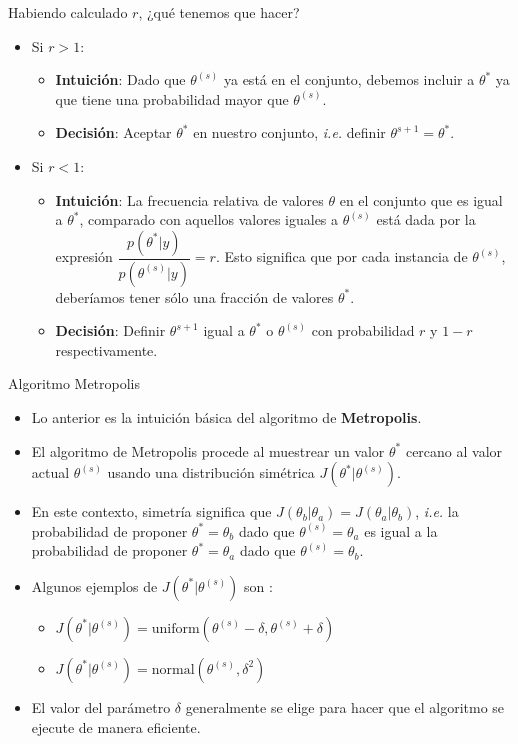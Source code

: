 \documentclass[11pt]{beamer}
\begin{document}
\begin{frame}
Habiendo calculado $r$, ¿qué tenemos que hacer?

	\begin{itemize}
		\item Si $r >1$:
			\begin{itemize}
				\item \textbf{Intuición}: Dado que $\theta^{(s)}$ ya está en el conjunto, debemos incluir a $\theta^{*}$ ya que tiene una probabilidad mayor que $\theta^{(s)}$.
				\item \textbf{Decisión}: Aceptar $\theta^{*}$ en nuestro conjunto, \textit{i.e.} definir $\theta^{s+1}=\theta^{*}$.
			\end{itemize}
		\item Si $r < 1$:
			\begin{itemize}
				\item \textbf{Intuición}: La frecuencia relativa de valores $\theta$ en el conjunto que es igual a $\theta^{*}$, comparado con aquellos valores iguales a $\theta^{(s)}$ está dada por la expresión $\dfrac{p(\theta^{*} | y)}{p(\theta^{(s)}|y)} = r$. Esto significa que por cada instancia de $\theta^{(s)}$, deberíamos tener sólo una fracción de valores $\theta^{*}$.
				\item \textbf{Decisión}:  Definir $\theta^{s+1}$ igual a $\theta^{*}$ o $\theta^{(s)}$ con probabilidad $r$ y $1-r$ respectivamente.  
			\end{itemize}
	\end{itemize}
\end{frame}

\begin{frame}{Algoritmo Metropolis} 
	\begin{itemize}
		\item Lo anterior es la intuición básica del algoritmo de \textbf{Metropolis}.
		\item El algoritmo de Metropolis procede al muestrear un valor $\theta^{*}$ cercano al valor actual $\theta^{(s)}$ usando una distribución simétrica  $J(\theta^{*} | \theta^{(s)})$.
		\item En este contexto, simetría significa que $J(\theta_b | \theta_a) = J(\theta_a | \theta_b)$, \textit{i.e.} la probabilidad de proponer  $\theta^{*} = \theta_b$ dado que $\theta^{(s)}=\theta_a$ es igual a la probabilidad de proponer $\theta^{*} = \theta_a$ dado que $\theta^{(s)}=\theta_b$.
		\item Algunos ejemplos de $J(\theta^{*} | \theta^{(s)})$ son :
			\begin{itemize}
				\item $J(\theta^{*} | \theta^{(s)}) = \text{uniform}(\theta^{(s)}- \delta,\theta^{(s)} + \delta )$
				\item $J(\theta^{*} | \theta^{(s)}) = \text{normal}(\theta^{(s)},\delta^{2})$
			\end{itemize}
		\item El valor del parámetro $\delta$ generalmente se elige para hacer que el algoritmo se ejecute de manera eficiente.
	\end{itemize} 
\end{frame}
\end{document}
